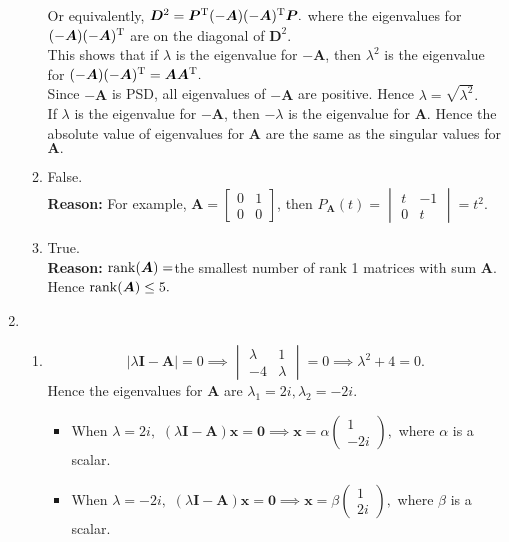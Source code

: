\begin{enumerate}
\begin{enumerate}
\[\]
Or equivalently, $\bm D^2=\bm P^{\mathrm T}(-\bm A)(-\bm A)^{\mathrm T}\bm P.$
where the eigenvalues for $(-\bm A)(-\bm A)^{\mathrm T}$ are on the diagonal of $\bm D^2$.\\
This shows that if $\lambda$ is the eigenvalue for $-\bm A$, then $\lambda^2$ is the eigenvalue for $(-\bm A)(-\bm A)^{\mathrm T}=\bm A\bm A^{\mathrm T}.$\\
Since $-\bm A$ is PSD, all eigenvalues of $-\bm A$ are positive. Hence $\lambda=\sqrt{\lambda^2}.$\\
If $\lambda$ is the eigenvalue for $-\bm A$, then $-\lambda$ is the eigenvalue for $\bm A$. Hence the absolute value of eigenvalues for $\bm A$ are the same as the singular values for $\bm A.$
\item
False.\\
\textbf{Reason: }For example, $\bm A=\begin{bmatrix}
0&1\\0&0
\end{bmatrix}$, then $P_{\bm A}(t)=\begin{vmatrix}
t&-1\\0&t
\end{vmatrix}
=t^2.$
\item
True.\\
\textbf{Reason: }$\operatorname{rank}(\bm A)=$the smallest number of rank 1 matrices with sum $\bm A$. Hence $\operatorname{rank}(\bm A)\le 5.$
\end{enumerate}
\item
\begin{enumerate}
\item
\[
|\lambda\bm I-\bm A|=0\implies
\begin{vmatrix}
\lambda&1\\-4&\lambda
\end{vmatrix}=0
\implies
\lambda^2+4=0.
\]
Hence the eigenvalues for $\bm A$ are $\lambda_1=2i,\lambda_2=-2i.$\\
\begin{itemize}
\item
When $\lambda=2i,$ $(\lambda\bm I-\bm A)\bm x=\bm 0\implies\bm x=\alpha\begin{pmatrix}
1\\-2i
\end{pmatrix},$ where $\alpha$ is a scalar.
\item
When $\lambda=-2i,$ $(\lambda\bm I-\bm A)\bm x=\bm 0\implies\bm x=\beta\begin{pmatrix}
1\\2i
\end{pmatrix},$ where $\beta$ is a scalar.

\end{itemize}
\end{enumerate}
\end{enumerate}
